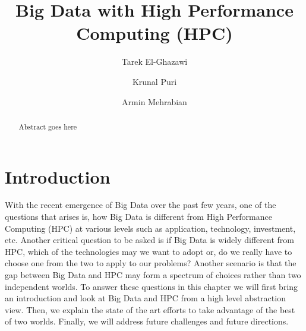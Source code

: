 \documentclass[runningheads,a4paper]{llncs}
\begin{document}


\title{Big Data with High Performance Computing (HPC)}

\author{Tarek El-Ghazawi \and Krunal Puri \and Armin Mehrabian}

%

			
\maketitle

\begin{abstract}
Abstract goes here
\end{abstract}


\section{Introduction}\label{sec:intro}
With the recent emergence of Big Data over the past few years, one of the questions that arises is, how Big Data is different from High Performance Computing (HPC) at various levels such as application, technology, investment, etc. Another critical question to be asked is if Big Data is widely different from HPC, which of the technologies may we want to adopt or, do we really have to choose one from the two to apply to our problems? Another scenario is that the gap between Big Data and HPC may form a spectrum of choices rather than two independent worlds. To answer these questions in this chapter we will first bring an introduction and look at Big Data and HPC from a high level abstraction view. Then, we explain the state of the art efforts to take advantage of the best of two worlds. Finally, we will address future challenges and future directions.\\
\end{document}
